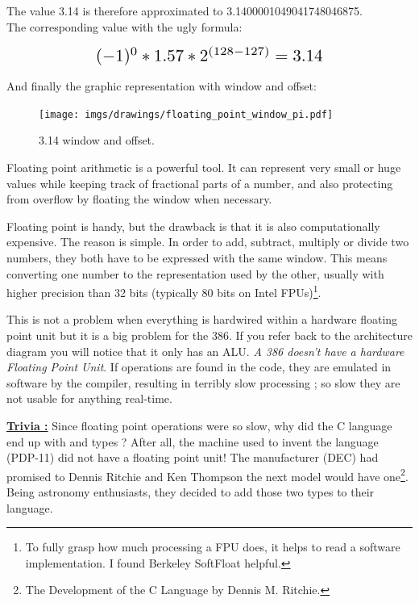 \documentclass[book.tex]{subfiles}
\begin{document}
The value 3.14 is therefore approximated to 3.1400001049041748046875.\\

The corresponding value with the ugly formula:

\begin{equation*}
\scalebox{1.5}{
$(-1)^0 * 1.57 * 2^{(128-127)} = 3.14$
}
\end{equation*}

\par

And finally the graphic representation with window and offset:\\

\begin{figure}[H]
\centering
\texttt{[image: imgs/drawings/floating\_point\_window\_pi.pdf]}

\caption{3.14 window and offset.}
\label{fig:fp_internals}
\end{figure}
  \bigskip

Floating point arithmetic is a powerful tool. It can represent very small or huge values while keeping track of fractional parts of a number, and also protecting from overflow by floating the window when necessary.\\
\par
Floating point is handy, but the drawback is that it is also computationally expensive. The reason is simple. In order to add, subtract, multiply or divide two numbers, they both have to be expressed with the same window. This means converting one number to the representation used by the other, usually with higher precision than 32 bits (typically 80 bits on Intel FPUs)\footnote{To fully grasp how much processing a FPU does, it helps to read a software implementation. I found Berkeley SoftFloat helpful.}.\\
\par
This is not a problem when everything is hardwired within a hardware floating point unit but it is a big problem for the 386. If you refer back to the architecture diagram you will notice that it only has an ALU. \emph{A 386 doesn't have a hardware Floating Point Unit}. If  operations are found in the code, they are emulated in software by the compiler, resulting in terribly slow processing ; so slow they are not usable for anything real-time.\\ 
\par


 \textbf{\underline{Trivia :}} Since floating point operations were so slow, why did the C language end up with  and  types ? After all, the machine used to invent the language (PDP-11) did not have a floating point unit! The manufacturer (DEC) had promised to Dennis Ritchie and Ken Thompson the next model would have one\footnote{The Development of the C Language by Dennis M. Ritchie.}. Being astronomy enthusiasts, they decided to add those two types to their language.\\
\par
\end{document}

